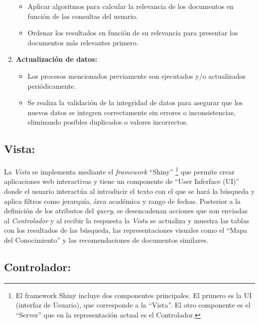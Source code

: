 \documentclass[
  12pt,
  openany]{book}
\begin{document}
\begin{enumerate}
  \begin{itemize}
  \item
    Aplicar algoritmos para calcular la relevancia de los documentos en función de las consultas del usuario.
  \item
    Ordenar los resultados en función de su relevancia para presentar los documentos más relevantes primero.
  \end{itemize}
\item
  \textbf{Actualización de datos:}

  \begin{itemize}
  \item
    Los procesos mencionados previamente son ejecutados y/o actualizados periódicamente.
  \item
    Se realiza la validación de la integridad de datos para asegurar que los nuevos datos se integren correctamente sin errores o inconsistencias, eliminando posibles duplicados o valores incorrectos.
  \end{itemize}
\end{enumerate}

\hypertarget{vista}{%
\subsection{\texorpdfstring{\textbf{Vista:}}{Vista:}}\label{vista}}

La \emph{Vista} se implementa mediante el \emph{framework} ``Shiny'' \citep{shiny} \footnote{El framework Shiny incluye dos componentes principales. El primero es la UI (interfaz de Usuario), que corresponde a la ``Vista''. El otro componente es el ``Server'' que en la representación actual es el Controlador.} que permite crear aplicaciones web interactivas y tiene un componente de ``User Inferface (UI)'' donde el usuario interactúa al introducir el texto con el que se hará la búsqueda y aplica filtros como jerarquía, área académica y rango de fechas. Posterior a la definición de los atributos del \emph{query}, se desencadenan acciones que son enviadas al \emph{Controlador} y al recibir la respuesta la \emph{Vista} se actualiza y muestra las tablas con los resultados de las búsqueda, las representaciones visuales como el ``Mapa del Conocimiento'' y las recomendaciones de documentos similares.

\hypertarget{controlador}{%
\subsection{\texorpdfstring{\textbf{Controlador:}}{Controlador:}}\label{controlador}}
\end{document}
